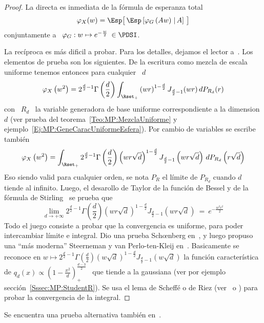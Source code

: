 \begin{proof}
  La directa es inmediata de la f\'ormula de esperanza total
  \[
  \varphi_X(w)  = \Esp\big[  \, \Esp\left[  \varphi_G\left( A  w  \right) \left.
    \right| A\right] \, \big]
  \]
  conjuntamente a \ $\varphi_G: w \mapsto e^{-\frac{w}{2}} \: \in \PDSI$.

  La rec\'iproca es m\'as dificil a probar. Para los detalles, dejamos el lector
  a~\cite{Sch38}. Los  elementos de prueba  son los siguientes. De  la escritura
  como mezcla de escala uniforme tenemos entonces para cualquier \ $d$
  \[
  \varphi_X\left(  w^2  \right)  =  2^{\frac{d}{2}-1}  \Gamma\left(  \frac{d}{2}
  \right) \int_{\Rset_+} \left(  w r \right)^{1-\frac{d}{2}} J_{\frac{d}{2}-1}(w
  r) \, dP_{R_d}(r)
  \]
  con \  $R_d$ \ la  variable generadora de  base uniforme correspondiente  a la
  dimension   $d$   (ver   prueba  del   teorema~\ref{Teo:MP:MezclaUniforme}   y
  ejemplo~\ref{Ej:MP:GeneCaracUniformeEsfera}).  Por   cambio  de  variables  se
  escribe tambi\'en
  \[
  \varphi_X\left(  w^2 \right)  = \int_{\Rset_+}  2^{\frac{d}{2}-1} \Gamma\left(
    \frac{d}{2}   \right)   \left(    w   r   \sqrt{d}   \right)^{1-\frac{d}{2}}
  J_{\frac{d}{2}-1}\left(  w r  \sqrt{d}  \right) \,  dP_{R_d}\left( r  \sqrt{d}
  \right)
  \]
  Eso siendo valid para cualquier orden,  se nota $P_R$ el l\'imite de $P_{R_d}$
  cuando $d$ tiende al infinito.  Luego,  el desarollo de Taylor de la funci\'on
  de Bessel  y de  la f\'ormula de  Stirling~\cite[Ec.~8.402~y~8.327]{GraRyz} se
  prueba que
  \[
  \lim_{d \to +\infty} 2^{\frac{d}{2}-1} \Gamma\left( \frac{d}{2} \right) \left(
    w  r \sqrt{d} \right)^{1-\frac{d}{2}}  J_{\frac{d}{2}-1}\left( w  r \sqrt{d}
  \right) \: = \: e^{-\frac{w^2 r^2}{2}}
  \]
  Todo el  juego consiste a probar  que la convergencia es  uniforme, para poder
  intercambiar   l\'imite   e    integral.    Dio   una   prueba   Sch{\oe}nberg
  en~\cite{Sch38},  y  luego propuso  una  ``m\'as  moderna''  Steerneman y  van
  Perlo-ten-Kleij  en~\cite{SteVan05}.  Basicamente  se reconoce  en  $w \mapsto
  2^{\frac{d}{2}-1}   \Gamma\left(  \frac{d}{2}   \right)   \left(  w   \sqrt{d}
  \right)^{1-\frac{d}{2}}   J_{\frac{d}{2}-1}\left(  w   \sqrt{d}   \right)$  la
  funci\'on  caracter\'istica  de  $q_d(x)  \propto  \left(  1  -  \frac{x^2}{d}
  \right)_+^{\frac{d-3}{2}}$  \  que tiende  a  la  gaussiana  (ver por  ejemplo
  secci\'on~\ref{Sssec:MP:StudentR}).   Se usa el  lema de  Scheff\'e o  de Riez
  (ver~\cite{Rie28,  Sch47, Nov72,  Kus10} o  \cite{AthLah06,  Bog07:v1, Bil12})
  para probar la convergencia de la integral.
\end{proof}
%
\noindent  Se  encuentra  una  prueba alternativa  tambi\'en  en~\cite{FanKot90,
  Kin72}.

